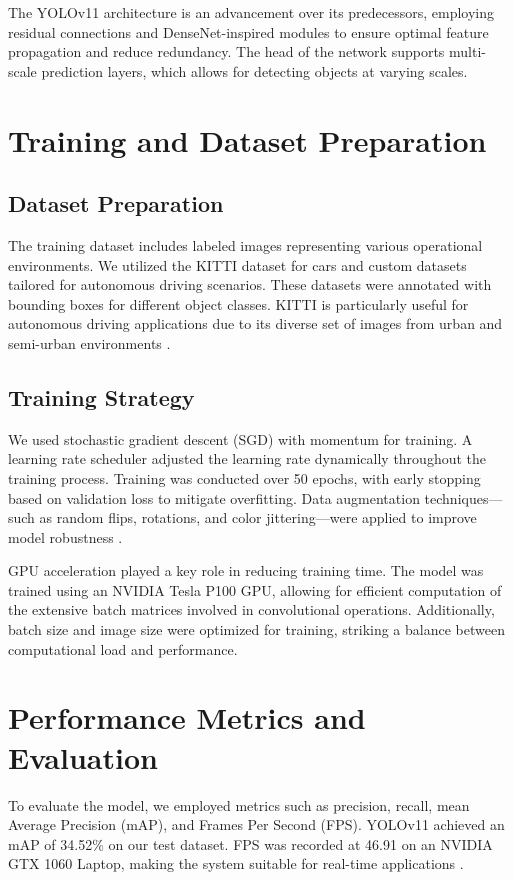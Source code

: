 \documentclass[12pt]{article}
\begin{document}
The YOLOv11 architecture is an advancement over its predecessors, employing residual connections and DenseNet-inspired modules to ensure optimal feature propagation and reduce redundancy. The head of the network supports multi-scale prediction layers, which allows for detecting objects at varying scales.

\section{Training and Dataset Preparation}

\subsection{Dataset Preparation}
The training dataset includes labeled images representing various operational environments. We utilized the KITTI dataset for cars and custom datasets tailored for autonomous driving scenarios. These datasets were annotated with bounding boxes for different object classes. KITTI is particularly useful for autonomous driving applications due to its diverse set of images from urban and semi-urban environments \cite{xu2022real}.

\subsection{Training Strategy}
We used stochastic gradient descent (SGD) with momentum for training. A learning rate scheduler adjusted the learning rate dynamically throughout the training process. Training was conducted over 50 epochs, with early stopping based on validation loss to mitigate overfitting. Data augmentation techniques—such as random flips, rotations, and color jittering—were applied to improve model robustness \cite{li2022real}.

GPU acceleration played a key role in reducing training time. The model was trained using an NVIDIA Tesla P100 GPU, allowing for efficient computation of the extensive batch matrices involved in convolutional operations. Additionally, batch size and image size were optimized for training, striking a balance between computational load and performance.

\section{Performance Metrics and Evaluation}

To evaluate the model, we employed metrics such as precision, recall, mean Average Precision (mAP), and Frames Per Second (FPS). YOLOv11 achieved an mAP of 34.52\% on our test dataset. FPS was recorded at 46.91 on an NVIDIA GTX 1060 Laptop, making the system suitable for real-time applications \cite{ashraf2024v}.
\end{document}
